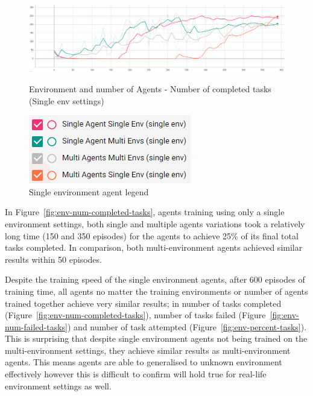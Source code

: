 \begin{figure}[H]
    \centering
    \begin{minipage}{0.75\linewidth}
        \centering
        \includegraphics[width=\linewidth]{figures/5_evaluation_figs/env_agent_num_training_fig/single_env_num_completed_tasks.png}
        \caption{Environment and number of Agents - Number of completed tasks (Single env settings)}
        \label{fig:single_env_num_completed_tasks}
    \end{minipage}\hfill
    \begin{minipage}{0.25\linewidth}
        \centering
        \includegraphics[width=\linewidth]{figures/5_evaluation_figs/env_agent_num_training_fig/single_env_legend.png}
        \caption{Single environment agent legend}
        \label{fig:single_env_legend}
    \end{minipage}
\end{figure}

In Figure~\ref{fig:env-num-completed-tasks}, agents training using only a single environment settings, both single and
multiple agents variations took a relatively long time (150 and 350 episodes) for the agents to achieve 25\% of its
final total tasks completed. In comparison, both multi-environment agents achieved similar results within 50 episodes.

Despite the training speed of the single environment agents, after 600 episodes of training time, all agents no matter
the training environments or number of agents trained together achieve very similar results; in number of tasks
completed (Figure~\ref{fig:env-num-completed-tasks}), number of tasks failed (Figure~\ref{fig:env-num-failed-tasks})
and number of task attempted (Figure~\ref{fig:env-percent-tasks}). This is surprising that despite single environment
agents not being trained on the multi-environment settings, they achieve similar results as multi-environment agents.
This means agents are able to generalised to unknown environment effectively however this is difficult to confirm will
hold true for real-life environment settings as well.

